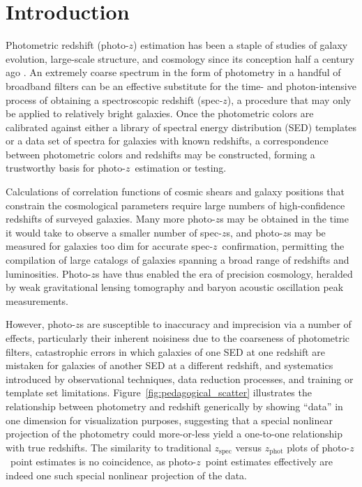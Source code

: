 \documentclass[iop]{emulateapj}
\newcommand{\sz}{spec-$z$}
\newcommand{\pz}{photo-$z$}
\newcommand{\Pz}{Photo-$z$}
\begin{document}

\maketitle

\section{Introduction}
\label{sec:intro}

Photometric redshift (\pz) estimation has been a staple of studies of galaxy evolution, large-scale structure, and cosmology since its conception half a century ago \citep{baum_photoelectric_1962}.  
An extremely coarse spectrum in the form of photometry in a handful of broadband filters can be an effective substitute for the time- and photon-intensive process of obtaining a spectroscopic redshift (\sz), a procedure that may only be applied to relatively bright galaxies.  
Once the photometric colors are calibrated against either a library of spectral energy distribution (SED) templates or a data set of spectra for galaxies with known redshifts, a correspondence between photometric colors and redshifts may be constructed, forming a trustworthy basis for \pz\ estimation or testing.

Calculations of correlation functions of cosmic shears and galaxy positions that constrain the cosmological parameters require large numbers of high-confidence redshifts of surveyed galaxies.  
Many more \pz s may be obtained in the time it would take to observe a smaller number of \sz s, and \pz s may be measured for galaxies too dim for accurate \sz\ confirmation, permitting the compilation of large catalogs of galaxies spanning a broad range of redshifts and luminosities.  
\Pz s have thus enabled the era of precision cosmology, heralded by weak gravitational lensing tomography and baryon acoustic oscillation peak measurements.  

However, \pz s are susceptible to inaccuracy and imprecision via a number of effects, particularly their inherent noisiness due to the coarseness of photometric filters, catastrophic errors in which galaxies of one SED at one redshift are mistaken for galaxies of another SED at a different redshift, and systematics introduced by observational techniques, data reduction processes, and training or template set limitations.  
Figure~\ref{fig:pedagogical_scatter} illustrates the relationship between photometry and redshift generically by showing ``data'' in one dimension for visualization purposes, suggesting that a special nonlinear projection of the photometry could more-or-less yield a one-to-one relationship with true redshifts.
The similarity to traditional $z_{\mathrm{spec}}$ versus $z_{\mathrm{phot}}$ plots of \pz\ point estimates is no coincidence, as \pz\ point estimates effectively are indeed one such special nonlinear projection of the data.
\end{document}
